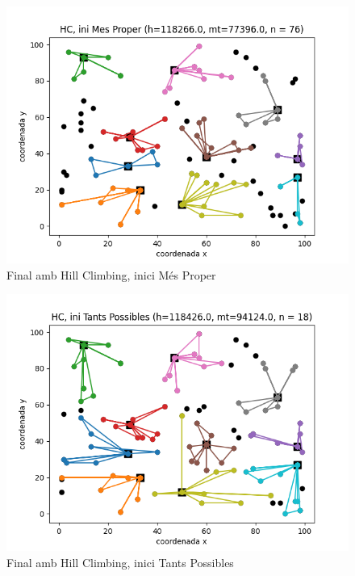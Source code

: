 \documentclass[a4paper]{article}
\begin{document}
\begin{figure}[htp]
\centering
\includegraphics[scale=0.65]{images/fig7.png}
\caption{Final amb Hill Climbing, inici Més Proper}
\centering
\end{figure}

\begin{figure}[htp]
\centering
\includegraphics[scale=0.65]{images/fig8.png}
\caption{Final amb Hill Climbing, inici Tants Possibles}
\centering
\end{figure}
\end{document}
